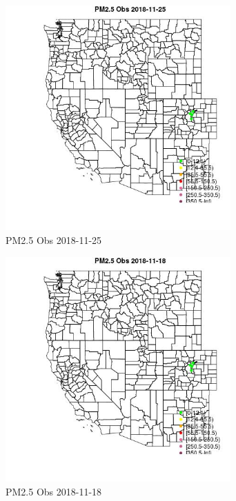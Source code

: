 \begin{figure} 
\centering  
\includegraphics[width=0.77\textwidth]{Code_Outputs/Report_ML_input_PM25_Step4_part_e_de_duplicated_aveswNAs_MapObsPM25_Obs2018-11-25.jpg} 
\caption{\label{fig:Report_ML_input_PM25_Step4_part_e_de_duplicated_aveswNAsMapObsPM25_Obs2018-11-25}PM2.5 Obs 2018-11-25} 
\end{figure} 
 

\begin{figure} 
\centering  
\includegraphics[width=0.77\textwidth]{Code_Outputs/Report_ML_input_PM25_Step4_part_e_de_duplicated_aveswNAs_MapObsPM25_Obs2018-11-18.jpg} 
\caption{\label{fig:Report_ML_input_PM25_Step4_part_e_de_duplicated_aveswNAsMapObsPM25_Obs2018-11-18}PM2.5 Obs 2018-11-18} 
\end{figure} 
 

